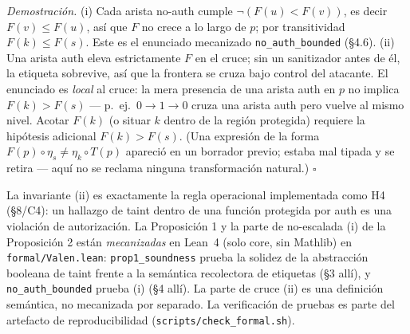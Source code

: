 \documentclass[11pt]{article}
\begin{document}
\noindent\emph{Demostración.} (i) Cada arista no-auth cumple
$\neg(F(u) < F(v))$, es decir $F(v) \le F(u)$, así que $F$ no crece a lo largo de
$p$; por transitividad $F(k) \le F(s)$. Este es el enunciado mecanizado
\texttt{no\_auth\_bounded} (\S4.6). (ii) Una arista auth eleva estrictamente $F$ en
el cruce; sin un sanitizador antes de él, la etiqueta sobrevive, así que la
frontera se cruza bajo control del atacante. El enunciado es \emph{local} al
cruce: la mera presencia de una arista auth en $p$ no implica $F(k) > F(s)$ ---
p.~ej.\ $0 \to 1 \to 0$ cruza una arista auth pero vuelve al mismo nivel. Acotar
$F(k)$ (o situar $k$ dentro de la región protegida) requiere la hipótesis adicional
$F(k) > F(s)$. (Una expresión de
la forma $F(p)\circ\eta_s \neq \eta_k\circ T(p)$ apareció en un borrador previo;
estaba mal tipada y se retira --- aquí no se reclama ninguna transformación
natural.) $\square$

\noindent La invariante (ii) es exactamente la regla operacional implementada como
H4 (\S8/C4): un hallazgo de taint dentro de una función protegida por auth es una
violación de autorización. La Proposición 1 y la parte de no-escalada (i) de la
Proposición 2 están \emph{mecanizadas} en Lean~4
(solo core, sin Mathlib) en \texttt{formal/Valen.lean}:
\texttt{prop1\_soundness} prueba la solidez de la abstracción booleana de taint
frente a la semántica recolectora de etiquetas (\S3 allí), y
\texttt{no\_auth\_bounded} prueba (i)
(\S4 allí). La parte de cruce (ii) es una definición semántica, no mecanizada por
separado. La verificación de pruebas es parte del artefacto de reproducibilidad
(\texttt{scripts/check\_formal.sh}).
\end{document}
